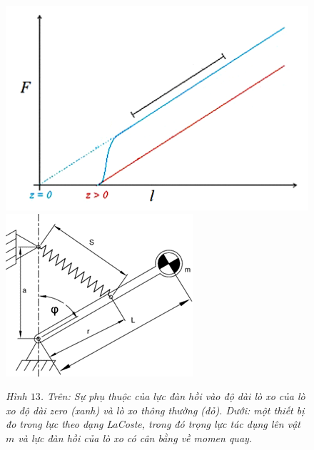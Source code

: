 \begin{multicols}{2}
	\begin{figure}[H]
		\vspace*{-5pt}
		\centering
		\captionsetup{labelformat= empty, justification=centering}
		\includegraphics[width =1\linewidth]{15}
		\includegraphics[width =1\linewidth]{15b}
		\caption{\small\textit{\color{timhieukhoahoc}Hình $13$. Trên: Sự phụ thuộc của lực đàn hồi vào độ dài lò xo của lò xo độ dài zero (xanh) và lò xo thông thường (đỏ). Dưới: một thiết bị đo trong lực theo dạng LaCoste, trong đó trọng lực tác dụng lên vật $m$ và lực đàn hồi của lò xo có cân bằng về momen quay.}}
		\vspace*{-10pt}
	\end{figure}

\end{multicols}
